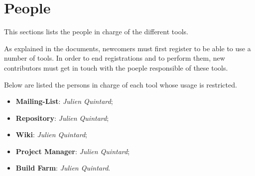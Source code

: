 %
%
%
%
%
%

%
%

\chapter{People}

This sections lists the people in charge of the different tools.

\newpage

%
%

As explained in the documents, newcomers must first register to be able to
use a number of tools. In order to end registrations and to perform them,
new contributors must get in touch with the poeple responsible of these
tools.

Below are listed the persons in charge of each tool whose usage is restricted.

\begin{itemize}
  \item
    \textbf{Mailing-List}: \textit{Julien Quintard};
  \item
    \textbf{Repository}: \textit{Julien Quintard};
  \item
    \textbf{Wiki}: \textit{Julien Quintard};
  \item
    \textbf{Project Manager}: \textit{Julien Quintard};
  \item
    \textbf{Build Farm}: \textit{Julien Quintard}.
\end{itemize}
